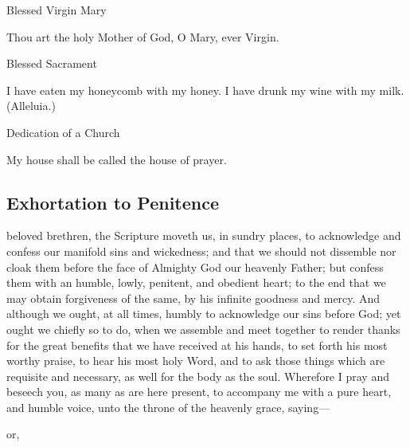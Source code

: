 \begin{multicols}{2}
\centerline{\color{RubricRed}\small%
Blessed Virgin Mary}
\par\noindent
Thou art the holy Mother of God, O Mary, ever Virgin.\\

\centerline{\color{RubricRed}\small%
Blessed Sacrament}
\par\noindent
I have eaten my honeycomb with my honey. I have drunk my wine with my milk. (Alleluia.)\\

\centerline{\color{RubricRed}\small%
Dedication of a Church}
\par\noindent
	My house shall be called the house of prayer.
\end{multicols}

\subsection{Exhortation to Penitence}
 beloved brethren, the Scripture moveth us, in sundry places, to acknowledge and confess our manifold sins and wickedness; and that we should not dissemble nor cloak them before the face of Almighty God our heavenly Father; but confess them with an humble, lowly, penitent, and obedient heart; to the end that we may obtain forgiveness of the same, by his infinite goodness and mercy. And although we ought, at all times, humbly to acknowledge our sins before God; yet ought we chiefly so to do, when we assemble and meet together to render thanks for the great benefits that we have received at his hands, to set forth his most worthy praise, to hear his most holy Word, and to ask those things which are requisite and necessary, as well for the body as the soul. Wherefore I pray and beseech you, as many as are here present, to accompany me with a pure heart, and humble voice, unto the throne of the heavenly grace, saying---

\begin{inhead}
    or,
\end{inhead}

